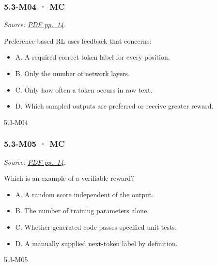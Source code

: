 \noindent\begin{minipage}{\linewidth}

\subsubsection{5.3-M04 · MC}\label{m04-mc-14}

\emph{Source:
\href{../Lecture\%20Slides/5.3.\%20Foundation\%20models.pdf\#page=14}{PDF
pp.~14}.}

Preference-based RL uses feedback that concerns:

\begin{itemize}
\tightlist
\item
  A. A required correct token label for every position.
\item
  B. Only the number of network layers.
\item
  C. Only how often a token occurs in raw text.
\item
  D. Which sampled outputs are preferred or receive greater reward.
\end{itemize}

\begin{solution}[8mm]{5.3-M04}

\end{solution}
\end{minipage}\par\medskip

\noindent\begin{minipage}{\linewidth}

\subsubsection{5.3-M05 · MC}\label{m05-mc-14}

\emph{Source:
\href{../Lecture\%20Slides/5.3.\%20Foundation\%20models.pdf\#page=14}{PDF
pp.~14}.}

Which is an example of a verifiable reward?

\begin{itemize}
\tightlist
\item
  A. A random score independent of the output.
\item
  B. The number of training parameters alone.
\item
  C. Whether generated code passes specified unit tests.
\item
  D. A manually supplied next-token label by definition.
\end{itemize}

\begin{solution}[8mm]{5.3-M05}

\end{solution}
\end{minipage}\par\medskip

